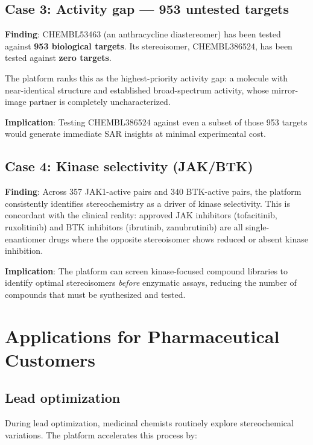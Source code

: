 \documentclass[11pt,a4paper]{article}
\begin{document}
\subsection{Case 3: Activity gap --- 953 untested targets}

\textbf{Finding}: CHEMBL53463 (an anthracycline diastereomer) has been tested
against \textbf{953 biological targets}. Its stereoisomer, CHEMBL386524, has
been tested against \textbf{zero targets}.

The platform ranks this as the highest-priority activity gap: a molecule with
near-identical structure and established broad-spectrum activity, whose
mirror-image partner is completely uncharacterized.

\textbf{Implication}: Testing CHEMBL386524 against even a subset of those
953 targets would generate immediate SAR insights at minimal experimental cost.

\subsection{Case 4: Kinase selectivity (JAK/BTK)}

\textbf{Finding}: Across 357 JAK1-active pairs and 340 BTK-active pairs, the
platform consistently identifies stereochemistry as a driver of kinase
selectivity. This is concordant with the clinical reality: approved JAK
inhibitors (tofacitinib, ruxolitinib) and BTK inhibitors (ibrutinib,
zanubrutinib) are all single-enantiomer drugs where the opposite
stereoisomer shows reduced or absent kinase inhibition.

\textbf{Implication}: The platform can screen kinase-focused compound libraries
to identify optimal stereoisomers \textit{before} enzymatic assays, reducing
the number of compounds that must be synthesized and tested.

\newpage

\section{Applications for Pharmaceutical Customers}

\subsection{Lead optimization}

During lead optimization, medicinal chemists routinely explore stereochemical
variations. The platform accelerates this process by:
\end{document}
